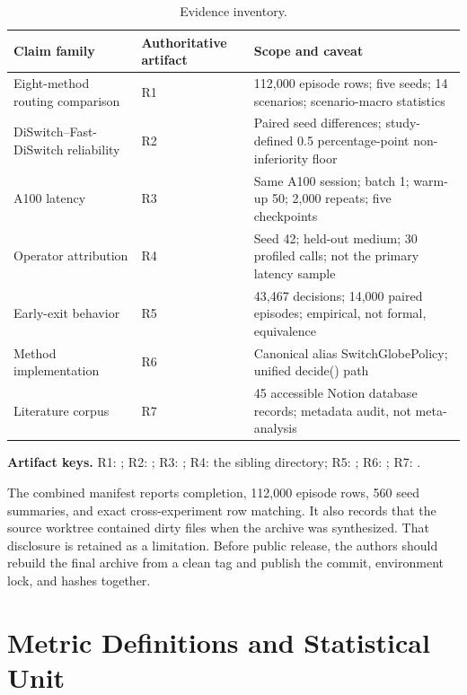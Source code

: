 \documentclass{ieeeaccess}
\begin{document}
\begin{table}[t]
\caption{Evidence inventory.}\label{tab:inventory}\small
\begin{tabularx}{\textwidth}{p{}p{}X}
\toprule
Claim family & Authoritative artifact & Scope and caveat \\
\midrule
Eight-method routing comparison & R1 & 112,000 episode rows; five seeds; 14 scenarios; scenario-macro statistics \\
DiSwitch--Fast-DiSwitch reliability & R2 & Paired seed differences; study-defined 0.5 percentage-point non-inferiority floor \\
A100 latency & R3 & Same A100 session; batch 1; warm-up 50; 2,000 repeats; five checkpoints \\
Operator attribution & R4 & Seed 42; held-out medium; 30 profiled calls; not the primary latency sample \\
Early-exit behavior & R5 & 43,467 decisions; 14,000 paired episodes; empirical, not formal, equivalence \\
Method implementation & R6 & Canonical alias SwitchGlobePolicy; unified decide() path \\
Literature corpus & R7 & 45 accessible Notion database records; metadata audit, not meta-analysis \\
\bottomrule
\end{tabularx}
\end{table}

\noindent\textbf{Artifact keys.} R1: ; R2: ; R3: ; R4: the sibling  directory; R5: ; R6: ; R7: .

The combined manifest reports completion, 112,000 episode rows, 560 seed summaries, and exact cross-experiment row matching. It also records that the source worktree contained dirty files when the archive was synthesized. That disclosure is retained as a limitation. Before public release, the authors should rebuild the final archive from a clean tag and publish the commit, environment lock, and hashes together.

\section{Metric Definitions and Statistical Unit}
\end{document}

